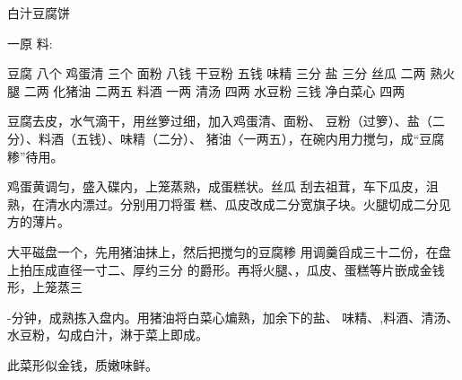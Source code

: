 \begin{recipe}[金钱豆腐]{白汁豆腐饼}



一原 料:

豆腐	八个	鸡蛋清	三个
面粉	八钱	干豆粉	五钱
味精	三分	盐	三分
丝瓜	二两	熟火腿	二两
化猪油	二两五	料酒	一两
清汤	四两	水豆粉	三钱
净白菜心	四两

\cooking

\step 	豆腐去皮，水气滴干，用丝箩过细，加入鸡蛋清、面粉、 豆粉（过箩）、盐（二分）、料酒（五钱）、味精（二分）、 猪油〈一两五），在碗内用力搅匀，成“豆腐糁”待用。

\step 	鸡蛋黄调匀，盛入碟内，上笼蒸熟，成蛋糕状。丝瓜 刮去祖茸，车下瓜皮，沮熟，在清水内漂过。分别用刀将蛋 糕、瓜皮改成二分宽旗子块。火腿切成二分见方的薄片。

\step 	大平磁盘一个，先用猪油抹上，然后把搅匀的豆腐糁 用调羹舀成三十二份，在盘上拍压成直径一寸二、厚约三分 的爵形。再将火腿、，瓜皮、蛋糕等片嵌成金钱形，上笼蒸三

-分钟，成熟拣入盘内。用猪油将白菜心煸熟，加余下的盐、 味精、,料酒、清汤、水豆粉，勾成白汁，淋于菜上即成。

\notes

此菜形似金钱，质嫩味鲜。

\end{recipe}

